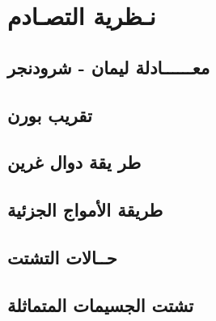\chapter{نـظرية التصـادم}

\label{Chapter7}


\section{معــــــادلة ليمان - شرودنجر}

\section{تقريب بورن}

\section{طر يقة دوال غرين}

\section{طريقة اﻷمواج الجزئية}

\section{حــالات التشتت}

\section{تشتت الجسيمات المتماثلة}




